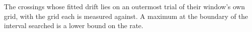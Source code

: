 \begin{table}
\caption{The crossings whose fitted drift lies on an outermost trial of
their window's own grid, with the grid each is measured against. A maximum
at the boundary of the interval searched is a lower bound on the rate.}
\label{tab:edge}
\footnotesize

\end{table}
